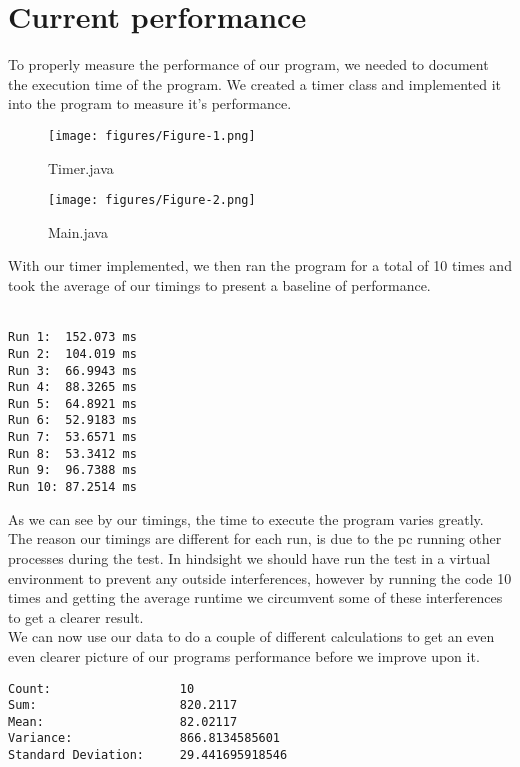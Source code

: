 \section{Current performance}

To properly measure the performance of our program, we needed to document the execution time of the program.
We created a timer class and implemented it into the program to measure it's performance. 

\begin{figure}[h]
    \caption{Timer.java}
    \texttt{[image: figures/Figure-1.png]}
    \label{fig:timer-class}
\end{figure}

\begin{figure}[h]
    \caption{Main.java}
    \texttt{[image: figures/Figure-2.png]}
    \label{fig:main-cass}
\end{figure}

With our timer implemented, we then ran the program for a total of 10 times and took the average of our timings to present a baseline of performance.\\\\

\begin{lstlisting}[]
Run 1:  152.073 ms
Run 2:  104.019 ms
Run 3:  66.9943 ms
Run 4:  88.3265 ms
Run 5:  64.8921 ms
Run 6:  52.9183 ms
Run 7:  53.6571 ms
Run 8:  53.3412 ms
Run 9:  96.7388 ms
Run 10: 87.2514 ms
\end{lstlisting}

\pagebreak
As we can see by our timings, the time to execute the program varies greatly.\\
The reason our timings are different for each run, is due to the pc running other processes during the test. In hindsight we should have run the test in a virtual environment to prevent any outside interferences, however by running the code 10 times and getting the average runtime we circumvent some of these interferences to get a clearer result.\\

We can now use our data to do a couple of different calculations to get an even even clearer picture of our programs performance before we improve upon it.\\
\begin{lstlisting}[]
Count:                  10
Sum:                    820.2117
Mean:                   82.02117
Variance:               866.8134585601
Standard Deviation:     29.441695918546
\end{lstlisting}